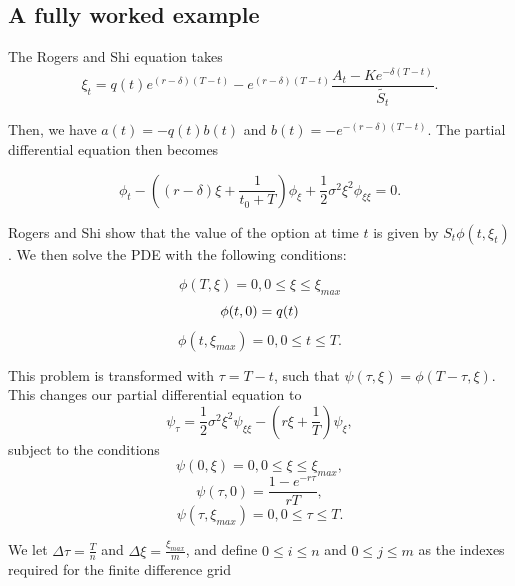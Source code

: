 \documentclass{article}
\begin{document}
\subsection{A fully worked example}
The Rogers and Shi equation takes
\begin{equation}
  \xi_t = q(t)e^{(r-\delta)(T-t)} - e^{(r-\delta)(T-t)}\frac{A_t - Ke^{-\delta(T-t)}}{\tilde{S_t}}.
\end{equation}

Then, we have \( a(t) = -q(t)b(t) \) and \(b(t) = -e^{-(r-\delta)(T-t)}\). The partial differential equation then becomes

\begin{equation}
  \phi_t - ( (r-\delta)\xi + \frac{1}{t_0 + T} ) \phi_\xi + \frac{1}{2}\sigma^2\xi^2\phi_{\xi\xi} = 0.
\end{equation}

Rogers and Shi show that the value of the option at time \(t\) is given by \(S_t\phi(t, \xi_t)\). We then solve the PDE with the following conditions:

\begin{equation}
  \phi(T, \xi) = 0, 0 \le \xi \le \xi_{max}
\end{equation}
\begin{equation}
  \phi(t, 0) = q(t) \\
\end{equation}
\begin{equation}
  \phi(t, \xi_{max}) = 0, 0 \le t \le T.
\end{equation}

This problem is transformed with \(\tau = T - t \), such that \(\psi(\tau, \xi) = \phi(T-\tau, \xi)\). This changes our partial differential equation to
\begin{equation}
  \psi_\tau = \frac{1}{2}\sigma^2\xi^2\psi_{\xi\xi} - (r\xi + \frac{1}{T})\psi_\xi,
\end{equation}
subject to the conditions
\begin{equation}
  \psi(0, \xi) = 0, 0 \le \xi \le \xi_{max},
\end{equation}
\begin{equation}
  \psi(\tau, 0) = \frac{1-e^{-r\tau}}{rT},
\end{equation}
\begin{equation}
  \psi(\tau, \xi_{max}) = 0, 0 \le \tau \le T.
\end{equation}

We let \(\Delta\tau = \frac{T}{n}\) and \(\Delta\xi = \frac{\xi_{max}}{m}\), and define \(0 \le i \le n\) and \(0 \le j \le m\) as the indexes required for the finite difference grid
\end{document}
